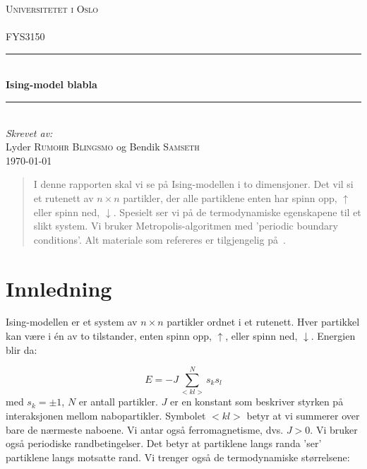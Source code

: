 \documentclass[11pt]{article}
\begin{document}
\begin{titlepage}
  \newcommand{\HRule}{\rule{\linewidth}{0.5mm}}
  \center
  \textsc{\LARGE Universitetet i Oslo}\\[1.5cm] %
  \textsc{\Large }\\[0.5cm] %
  \textsc{\large FYS3150}\\[0.5cm] %
  \HRule \\[0.4cm]
  { \huge \bfseries Ising-model blabla}\\[0.4cm]
  \HRule \\[1.5cm]
  \Large \emph{Skrevet av:}\\
  Lyder \textsc{Rumohr Blingsmo} og Bendik \textsc{Samseth}\\[3cm]
  {\large \today}\\[3cm]
  \vfill
\end{titlepage}

\begin{abstract}
I denne rapporten skal vi se på Ising-modellen i to dimensjoner. Det vil si
et rutenett av $n \times n $ partikler, der alle partiklene enten har
spinn opp, $\uparrow$ eller spinn ned, $\downarrow$. Spesielt ser vi
på de termodynamiske egenskapene til et slikt system. Vi bruker
Metropolis-algoritmen med 'periodic boundary conditions'. Alt materiale 
som refereres er tilgjengelig på~\cite{github-repo}. 
\end{abstract}

\section{Innledning}
\label{sec:innledning}
Ising-modellen er et system av $n \times n$ partikler ordnet i et rutenett. 
Hver partikkel kan være i én av to tilstander, enten spinn opp, $\uparrow$,
eller spinn ned, $\downarrow$. Energien blir da: 

\begin{equation}
  E=-J\sum_{<kl>}^{N}s_ks_l\label{eq:energi}
\end{equation}
med  $s_k=\pm 1$, $N$ er antall partikler.
$J$ er en konstant som beskriver styrken på interaksjonen mellom
nabopartikler. Symbolet $<kl>$ betyr at vi summerer over bare de
nærmeste naboene. Vi antar også  ferromagnetisme, dvs.  $J> 0$. Vi bruker også
periodiske randbetingelser. Det betyr at partiklene langs randa 'ser' 
partiklene langs motsatte rand. Vi trenger også de termodynamiske størrelsene:
\end{document}
